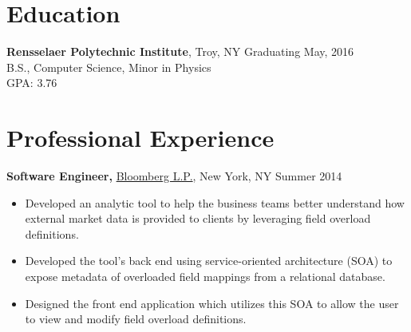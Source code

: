 \documentclass[margin]{res}
\begin{document}
 
\begin{minipage}{\textwidth}

 
\address{{\bf Present Address} \\ 2166 14th St \\ 2nd Floor \\ Troy, NY 12180 }
\address{{\bf Permanent Address} \\ 4 Oak Street \\ Cumberland, ME 04021 }
\begin{resume} 
 
\section{Education} 
{\bf Rensselaer Polytechnic Institute}, Troy, NY \hfill Graduating May, 2016 \\
B.S., Computer Science, Minor in Physics \\
GPA: 3.76
 

\section{Professional Experience}
{\bf Software Engineer,} \uline{Bloomberg L.P.}, New York, NY \hfill Summer 2014
 \begin{itemize} \itemsep -2pt
 \item Developed an analytic tool to help the business teams better understand how external market data is provided to clients by leveraging field overload definitions.
 \item Developed the tool's back end using service-oriented architecture (SOA) to expose metadata of overloaded field mappings from a relational database.
 \item Designed the front end application which utilizes this SOA to allow the user to view and modify field overload definitions.
 \end{itemize}




\end{resume}
\end{minipage}
\end{document}
